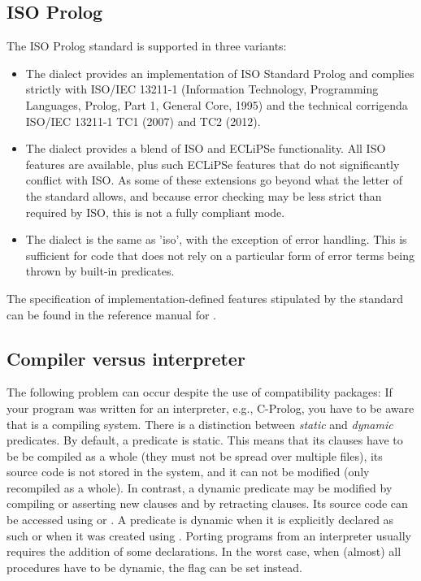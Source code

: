 \subsection{ISO Prolog}
The ISO Prolog standard \cite{isoprolog95} is supported in three variants:
\begin{itemize}
\item The  dialect
    provides an implementation of ISO Standard Prolog and complies
    strictly with ISO/IEC 13211-1 (Information Technology, Programming
    Languages, Prolog, Part 1, General Core, 1995) and the technical
    corrigenda ISO/IEC 13211-1 TC1 (2007) and TC2 (2012).
\item The  dialect provides
    a blend of ISO and ECLiPSe functionality.  All ISO features
    are available, plus such ECLiPSe features that do not significantly
    conflict with ISO.  As some of these extensions go beyond what the
    letter of the standard allows, and because error checking may be
    less strict than required by ISO, this is not a fully compliant mode.
\item The  dialect
    is the same as 'iso', with the exception of error handling.
    This is sufficient for code that does not rely on a particular
    form of error terms being thrown by built-in predicates.
\end{itemize}
The specification of implementation-defined features stipulated
by the standard can be found in the reference manual for
.


\subsection{Compiler versus interpreter}
The following problem can occur despite the use of compatibility packages:
If your program was written for an interpreter, e.g., C-Prolog,
you have to be aware that {\eclipse} is a compiling system.
There is a distinction between \emph{static} and \emph{dynamic} predicates.
By default, a predicate is static. This means that its clauses have to be
be compiled as a whole (they must not be spread over multiple files),
its source code is not stored in the system,
and it can not be modified (only recompiled as a whole).
In contrast, a dynamic predicate may be modified by compiling or
asserting new clauses and by retracting clauses.
Its source code can be accessed using
%
or
.%
A predicate is dynamic when it is explicitly declared as such or when
it was created using .
Porting programs from an interpreter usually requires the addition of
some  declarations.
In the worst case, when (almost) all procedures have to be dynamic,
the flag  can be set instead.


